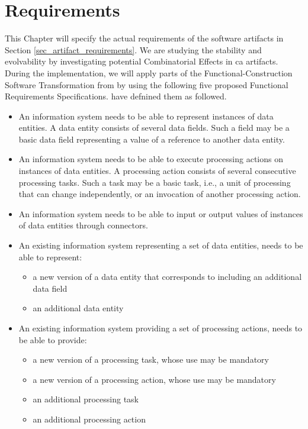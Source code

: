 \chapter{Requirements} \label{chap_requirements} 

This Chapter will specify the actual requirements of the software artifacts in Section
\ref{sec_artifact_requirements}. We are studying the stability and evolvability by
investigating potential Combinatorial Effects in \gls{ca} artifacts. During the
implementation, we will apply parts of the Functional-Construction Software Transformation
from \textcite[251]{mannaert_normalized_2016} by using the following five proposed
Functional Requirements Specifications. \textcite[254-261]{mannaert_normalized_2016} have
defnined them as followed.

\begin{itemize}
    \item An information system needs to be able to represent instances of
    data entities. A data entity consists of several data fields. Such a field may be a basic
    data field representing a value of a reference to another data entity.
    
    \item An information system needs to be able to execute processing actions on
    instances of data entities. A processing action consists of several consecutive processing
    tasks. Such a task may be a basic task, i.e., a unit of processing that can change
    independently, or an invocation of another processing action.
    
    \item An information system needs to be able to input or output values
    of instances of data entities through connectors.
    
    \item An existing information system representing a set of data entities, needs
    to be able to represent: 
    \begin{itemize}
        \item a new version of a data entity that corresponds to including an additional
        data field
        \item an additional data entity 
    \end{itemize}
    
    \item An existing information system providing a set of processing
    actions, needs to be able to provide:
    \begin{itemize}
        \item a new version of a processing task, whose use may be mandatory
        \item a new version of a processing action, whose use may be mandatory
        \item an additional processing task
        \item an additional processing action
    \end{itemize}
    
\end{itemize}



